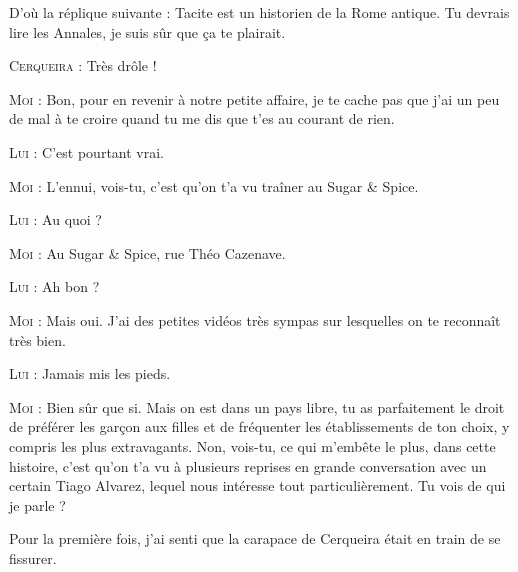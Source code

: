 \begin{dialogue}

%
%
%
D’où la réplique suivante : Tacite est un historien de la Rome antique. Tu devrais lire les Annales, je suis sûr que ça te plairait.

\textsc{Cerqueira} : Très drôle !

\textsc{Moi} : Bon, pour en revenir à notre petite affaire, je te cache pas que j’ai un peu de mal à te croire quand tu me dis que t’es au courant de rien.

\textsc{Lui} : C’est pourtant vrai.

\textsc{Moi} : L’ennui, vois-tu, c’est qu’on t’a vu traîner au Sugar \& Spice.

\textsc{Lui} : Au quoi ?

\textsc{Moi} : Au Sugar \& Spice, rue Théo Cazenave.

\textsc{Lui} : Ah bon ?

\textsc{Moi} : Mais oui. J’ai des petites vidéos très sympas sur lesquelles on te reconnaît très bien.

\textsc{Lui} : Jamais mis les pieds.

\textsc{Moi} : Bien sûr que si. Mais on est dans un pays libre, tu as parfaitement le droit de préférer les garçon aux filles et de fréquenter les établissements de ton choix, y compris les plus extravagants. Non, vois-tu, ce qui m’embête le plus, dans cette histoire, c’est qu’on t’a vu à plusieurs reprises en grande conversation avec un certain Tiago Alvarez, lequel nous intéresse tout particulièrement. Tu vois de qui je parle ?

\end{dialogue}

Pour la première fois, j’ai senti que la carapace de Cerqueira était en train de se fissurer.

